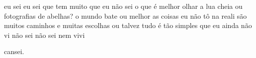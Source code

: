 \begin{poem}
\begin{stanza}
eu sei eu sei\verseline
que tem muito\verseline
que eu não sei\verseline
\qquad o que é melhor\verseline
\qquad olhar a lua cheia\verseline
\qquad ou fotografias\verseline
\qquad de abelhas?\verseline
o mundo bate\verseline
ou melhor\verseline
as coisas\verseline
\qquad eu não tô na reali\verseline
\qquad são muitos caminhos\verseline
\qquad e muitas escolhas\verseline
ou talvez\verseline
tudo é tão simples\verseline
que eu ainda não vi\verseline
\qquad não sei não sei\verseline
\qquad nem vivi
\end{stanza}
\begin{stanza}
\quad cansei.
\end{stanza}
\end{poem}